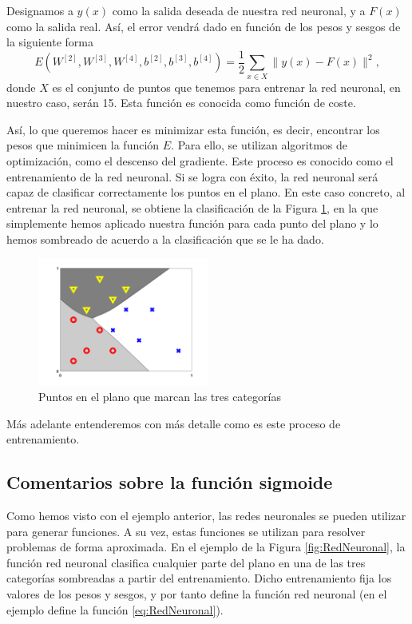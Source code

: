 \documentclass[a4paper,11pt,spanish, twoside, leqno]{tfg-uam}
\theoremstyle{definition}
\begin{document}
Designamos a $y(x)$ como la salida deseada de nuestra red neuronal, y a $F(x)$ como la salida real. Así, el error vendrá dado en función de los pesos y sesgos de la siguiente forma
\begin{equation*}
    E(W^{[2]},W^{[3]},W^{[4]},b^{[2]},b^{[3]},b^{[4]})=\frac{1}{2}\sum_{x\in X}\|y(x)-F(x)\|^2,
\end{equation*}
donde $X$ es el conjunto de puntos que tenemos para entrenar la red neuronal, en nuestro caso, serán 15. Esta función es conocida como función de coste.

Así, lo que queremos hacer es minimizar esta función, es decir, encontrar los pesos que minimicen la función $E$. Para ello, se utilizan algoritmos de optimización, como el descenso del gradiente. Este proceso es conocido como el entrenamiento de la red neuronal. Si se logra con éxito, la red neuronal será capaz de clasificar correctamente los puntos en el plano. En este caso concreto, al entrenar la red neuronal, se obtiene la clasificación de la Figura \ref{fig:ClasificacionFinal}, en la que simplemente hemos aplicado nuestra función para cada punto del plano y lo hemos sombreado de acuerdo a la clasificación que se le ha dado.

\begin{figure}[!ht]
    \centering
    \includegraphics[width=0.5\textwidth]{Figuras/classifier_back.png}
    \caption{Puntos en el plano que marcan las tres categorías}
    \label{fig:ClasificacionFinal}
\end{figure}

Más adelante entenderemos con más detalle como es este proceso de entrenamiento.

\subsection{Comentarios sobre la función sigmoide}
Como hemos visto con el ejemplo anterior, las redes neuronales se pueden utilizar para generar funciones. A su vez, estas funciones se utilizan para resolver problemas de forma aproximada. En el ejemplo de la Figura \ref{fig:RedNeuronal}, la función red neuronal clasifica cualquier parte del plano en una de las tres categorías sombreadas a partir del entrenamiento. Dicho entrenamiento fija los valores de los pesos y sesgos, y por tanto define la función red neuronal (en el ejemplo define la función \eqref{eq:RedNeuronal}).
\end{document}
